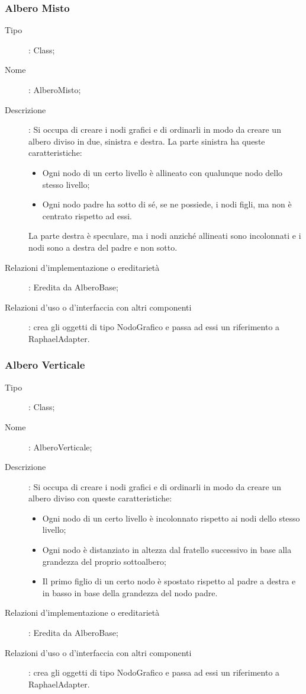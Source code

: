 \subsubsection{Albero Misto}
\begin{description}
\item[Tipo]: Class;
\item[Nome]: AlberoMisto;
\item[Descrizione]: Si occupa di creare i nodi grafici e di ordinarli in modo da creare un albero diviso in due, sinistra e destra. La parte sinistra ha queste caratteristiche:
\begin{itemize}
\item Ogni nodo di un certo livello è allineato con qualunque nodo dello stesso livello;
\item Ogni nodo padre ha sotto di sé, se ne possiede, i nodi figli, ma non è centrato rispetto ad essi.
\end{itemize}
La parte destra è speculare, ma i nodi anziché allineati sono incolonnati e i nodi sono a destra del padre e non sotto.
\item[Relazioni d'implementazione o ereditarietà]: Eredita da AlberoBase;
\item[Relazioni d'uso o d'interfaccia con altri componenti]: crea gli oggetti di tipo NodoGrafico e passa ad essi un riferimento a RaphaelAdapter.
\end{description}
\subsubsection{Albero Verticale}
\begin{description}
\item[Tipo]: Class;
\item[Nome]: AlberoVerticale;
\item[Descrizione]: Si occupa di creare i nodi grafici e di ordinarli in modo da creare un albero diviso con queste caratteristiche:
\begin{itemize}
\item Ogni nodo di un certo livello è incolonnato rispetto ai nodi dello stesso livello;
\item Ogni nodo è distanziato in altezza dal fratello successivo in base alla grandezza del
proprio sottoalbero;
\item Il primo figlio di un certo nodo è spostato rispetto al padre a destra e in basso in base
della grandezza del nodo padre.
\end{itemize}
\item[Relazioni d'implementazione o ereditarietà]: Eredita da AlberoBase;
\item[Relazioni d'uso o d'interfaccia con altri componenti]: crea gli oggetti di tipo NodoGrafico e passa ad essi un riferimento a RaphaelAdapter.
\end{description}
